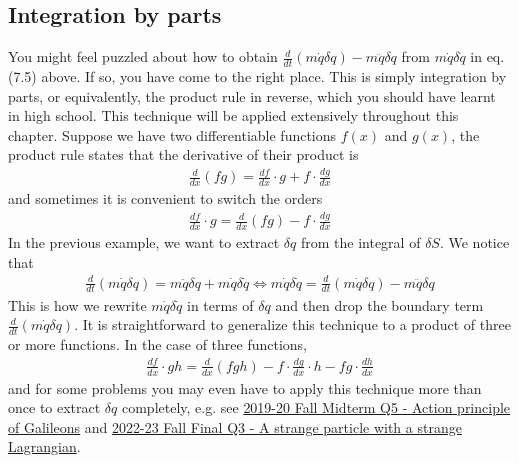 \documentclass[12pt]{book} %
\numberwithin{equation}{chapter}
\def\d{\delta}
\def\iff{\Longleftrightarrow}
\begin{document}
\subsection*{Integration by parts}
You might feel puzzled about how to obtain $\frac{d}{dt}(m\dot{q}\d q)-m\ddot{q}\d q$ from $m\dot{q}\d\dot{q}$ in eq. (7.5) above. If so, you have come to the right place. This is simply integration by parts, or equivalently, the product rule in reverse, which you should have learnt in high school. This technique will be applied extensively throughout this chapter.\bigskip\newline
Suppose we have two differentiable functions $f(x)$ and $g(x)$, the product rule states that the derivative of their product is
\begin{align*}
\frac{d}{dx}(fg)=\frac{df}{dx}\cdot g+f\cdot\frac{dg}{dx}
\end{align*}
and sometimes it is convenient to switch the orders
\begin{align*}
\frac{df}{dx}\cdot g=\frac{d}{dx}(fg)-f\cdot\frac{dg}{dx}
\end{align*}
In the previous example, we want to extract $\d q$ from the integral of $\d S$. We notice that
\begin{align*}
\frac{d}{dt}(m\dot{q}\d q)=m\ddot{q}\d q+m\dot{q}\d \dot{q}\iff m\dot{q}\d\dot{q}=\frac{d}{dt}(m\dot{q}\d q)-m\ddot{q}\d q
\end{align*}
This is how we rewrite $m\dot{q}\d\dot{q}$ in terms of $\d q$ and then drop the boundary term $\frac{d}{dt}(m\dot{q}\d q)$.\bigskip\newline
It is straightforward to generalize this technique to a product of three or more functions. In the case of three functions,
\begin{align*}
\frac{df}{dx}\cdot gh=\frac{d}{dx}(fgh)-f\cdot\frac{dg}{dx}\cdot h-fg\cdot\frac{dh}{dx}
\end{align*}
and for some problems you may even have to apply this technique more than once to extract $\d q$ completely, e.g. see \hyperref[Action principle of Galileons]{2019-20 Fall Midterm Q5 - Action principle of Galileons} and \hyperref[A strange particle with a strange Lagrangian]{2022-23 Fall Final Q3 - A strange particle with a strange Lagrangian}.
\end{document}
